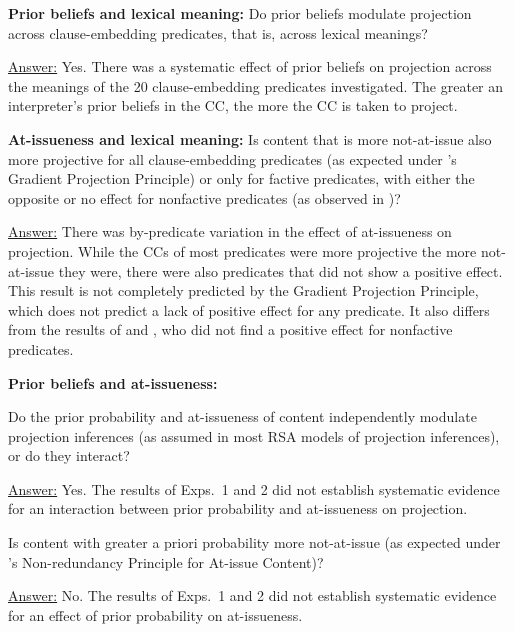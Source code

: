 \documentclass[11pt,fleqn]{article}
\newcommand{\6}{\mbox{$[\hspace*{-.6mm}[$}}
\newcommand{\9}{\mbox{$]\hspace*{-.6mm}]$}}
\newcommand{\citepos}[1]{\citeauthor{#1}'s \citeyear{#1}}
\begin{document}
\begin{exe}

 {\bf Prior beliefs and lexical meaning:} Do prior beliefs modulate projection across clause-embedding predicates, that is, across lexical meanings?

\underline{Answer:} Yes. There was a systematic effect of prior beliefs on projection across the meanings of the 20 clause-embedding predicates investigated. The greater an interpreter's prior beliefs in the CC, the more the CC is taken to project.

 {\bf At-issueness and lexical meaning:} Is content that is more not-at-issue also more projective for all clause-embedding predicates (as expected under \citepos{tbd-variability} Gradient Projection Principle) or only for factive predicates, with either the opposite or no effect for nonfactive predicates (as observed in \citealt{djaerv-bacovcin-salt27,djaerv-bacovcin2020,mahler-etal2020})? 

\underline{Answer:} There was by-predicate variation in the effect of at-issueness on projection. While the CCs of most predicates were more projective the more not-at-issue they were, there were also predicates that did not show a positive effect. This result is  not completely predicted by the Gradient Projection Principle, which does not predict a lack of positive effect for any predicate. It also differs from the results of \citealt{djaerv-bacovcin2020} and \citealt{mahler-etal2020}, who did not find a positive effect for nonfactive predicates.

 {\bf Prior beliefs and at-issueness:} 
\begin{xlist}
  Do the prior probability and at-issueness of content independently modulate projection inferences  (as assumed in most RSA models of projection inferences), or do they interact?  

\underline{Answer:} Yes. The results of Exps.~1 and 2 did not establish systematic evidence for an interaction between prior probability and at-issueness on projection.

 Is content with greater a priori probability more not-at-issue (as expected under \citepos{tonhauser-etal-eval} Non-redundancy Principle for At-issue Content)?

\underline{Answer:} No. The results of Exps.~1 and 2 did not establish systematic evidence for an effect of prior probability on at-issueness. 

\end{xlist}
\end{exe}
\end{document}
